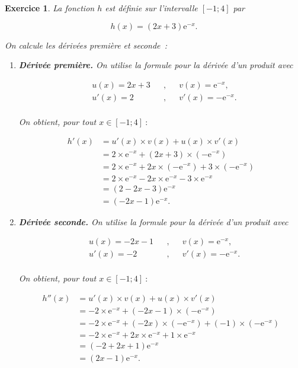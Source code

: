 \documentclass[10pt]{article}
\newtheorem{exo}{Exercice}
\begin{document}
\begin{exo}

La fonction $h$ est définie sur l'intervalle $\left[-1;4\right]$ par

\[ h(x) = (2x+3)\text{e}^{-x}.\]

On calcule les dérivées première et seconde~:

\medskip

\begin{enumerate}
\item \textbf{Dérivée première.} On utilise la formule pour la dérivée d'un produit avec

\begin{align*}
&u(x)=2x+3&&,&& v(x)=\text{e}^{-x}, \\
& u'(x)=2&&, &&v'(x)=-\text{e}^{-x}.\\
\end{align*}

On obtient, pour tout $x\in\left[-1;4\right]~:$


\begin{align*}h'(x)&=u'(x)\times v(x)+u(x)\times v'(x)\\
&=2\times\text{e}^{-x}+\left(2x+3\right)\times \left(-\text{e}^{-x}\right)\\
&=2\times\text{e}^{-x}+2x\times\left(-\text{e}^{-x}\right)+3\times\left(-\text{e}^{-x}\right)\\
&=2\times\text{e}^{-x}-2x\times\text{e}^{-x}-3\times\text{e}^{-x}\\
&=\left(2-2x-3\right)\text{e}^{-x}\\
&=\left(-2x-1\right)\text{e}^{-x}.
\end{align*}
\item \textbf{Dérivée seconde.}  On utilise la formule pour la dérivée d'un produit avec

\begin{align*}
&u(x)=-2x-1&&,&& v(x)=\text{e}^{-x}, \\
& u'(x)=-2&&, &&v'(x)=-\text{e}^{-x}.\\
\end{align*}

On obtient, pour tout $x\in\left[-1;4\right]~:$


\begin{align*}h''(x)&=u'(x)\times v(x)+u(x)\times v'(x)\\
&=-2\times\text{e}^{-x}+\left(-2x-1\right)\times \left(-\text{e}^{-x}\right)\\
&=-2\times\text{e}^{-x}+(-2x)\times\left(-\text{e}^{-x}\right)+(-1)\times\left(-\text{e}^{-x}\right)\\
&=-2\times\text{e}^{-x}+2x\times\text{e}^{-x}+1\times\text{e}^{-x}\\
&=\left(-2+2x+1\right)\text{e}^{-x}\\
&=\left(2x-1\right)\text{e}^{-x}.
\end{align*}
\end{enumerate}


\end{exo}
\end{document}
